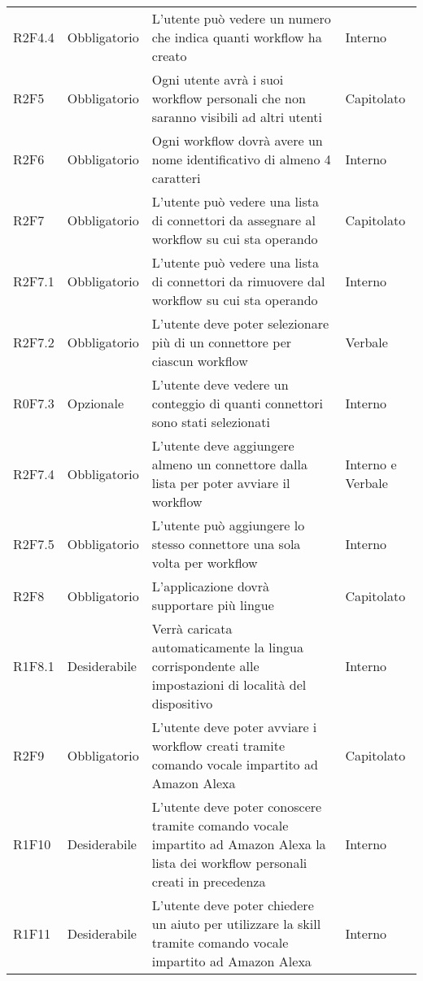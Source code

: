\begin{center}
\begin{longtable}{  >{\RaggedRight}p{2.5cm}  
						>{\RaggedRight}p{2.1cm} 
						>{\RaggedRight}p{7cm}  
						>{\RaggedRight}p{1.7cm} 
						}
		R2F4.4 & Obbligatorio & L'utente può vedere un numero che indica quanti workflow ha creato                                    & Interno              \\  
		R2F5   & Obbligatorio & Ogni utente avrà i suoi workflow personali che non saranno visibili ad altri utenti                   & Capitolato           \\  
		R2F6   & Obbligatorio & Ogni workflow dovrà avere un nome identificativo di almeno 4 caratteri                                & Interno              \\
		R2F7   & Obbligatorio & L'utente può vedere una lista di connettori da assegnare al workflow su cui sta operando              & Capitolato           \\  
		R2F7.1 & Obbligatorio & L'utente può vedere una lista di connettori da rimuovere dal workflow su cui sta operando             & Interno              \\  
		R2F7.2 & Obbligatorio & L'utente deve poter selezionare più di un connettore per ciascun workflow                             & Verbale              \\  
		R0F7.3 & Opzionale    & L'utente deve vedere un conteggio di quanti connettori sono stati selezionati                         & Interno              \\  
		R2F7.4 & Obbligatorio & L'utente deve aggiungere almeno un connettore dalla lista per poter avviare il workflow               & Interno e Verbale    \\  
		R2F7.5 & Obbligatorio & L'utente può aggiungere lo stesso connettore una sola volta per workflow                                  & Interno              \\  
		R2F8   & Obbligatorio & L'applicazione dovrà supportare più lingue                                                            & Capitolato           \\  
		R1F8.1 & Desiderabile & Verrà caricata automaticamente la lingua corrispondente alle impostazioni di località del dispositivo & Interno              \\
		R2F9   & Obbligatorio	& L'utente deve poter avviare i workflow creati tramite comando vocale impartito ad Amazon Alexa & Capitolato \\
		R1F10	& Desiderabile	& L'utente deve poter conoscere tramite comando vocale impartito ad Amazon Alexa la lista dei workflow personali creati in precedenza	& Interno \\
		R1F11	& Desiderabile	& L'utente deve poter chiedere un aiuto per utilizzare la skill tramite comando vocale impartito ad Amazon Alexa	& Interno \\

\end{longtable}
\end{center}
